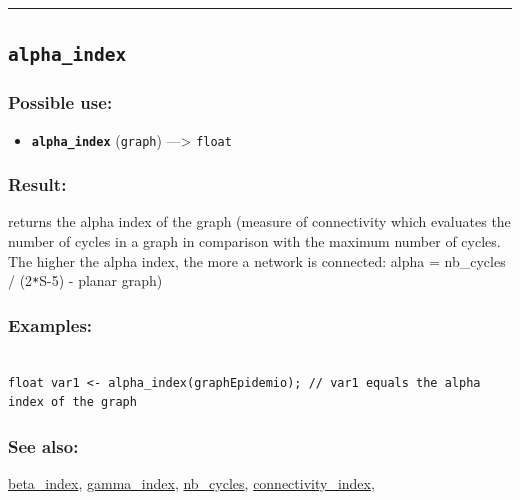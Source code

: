 \documentclass[]{book}
\providecommand{\tightlist}{%
  \setlength{\itemsep}{0pt}\setlength{\parskip}{0pt}}
\theoremstyle{definition}
\theoremstyle{definition}
\theoremstyle{definition}
\theoremstyle{remark}
\begin{document}
\begin{center}\rule{0.5\linewidth}{\linethickness}\end{center}

\subsection{\texorpdfstring{\texttt{alpha\_index}}{alpha\_index}}\label{alpha_index}

\subsubsection{Possible use:}\label{possible-use-33}

\begin{itemize}
\tightlist
\item
  \textbf{\texttt{alpha\_index}} (\texttt{graph}) ---\textgreater{}
  \texttt{float}
\end{itemize}

\subsubsection{Result:}\label{result-32}

returns the alpha index of the graph (measure of connectivity which
evaluates the number of cycles in a graph in comparison with the maximum
number of cycles. The higher the alpha index, the more a network is
connected: alpha = nb\_cycles / (2\texttt{*}S-5) - planar graph)

\subsubsection{Examples:}\label{examples-26}

\begin{verbatim}
 
float var1 <- alpha_index(graphEpidemio); // var1 equals the alpha index of the graph
\end{verbatim}

\subsubsection{See also:}\label{see-also-24}

\href{operators-b-to-c.html\#beta_index}{beta\_index},
\href{operators-d-to-h.html\#gamma_index}{gamma\_index},
\href{operators-n-to-r.html\#nb_cycles}{nb\_cycles},
\href{operators-b-to-c.html\#connectivity_index}{connectivity\_index},
\end{document}
